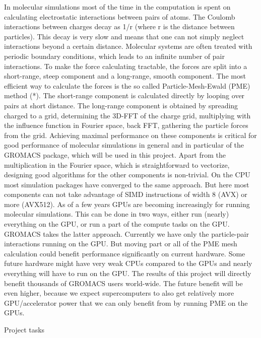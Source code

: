 \documentclass[12pt,a4paper]{report}
\begin{document}
\iffalse
In molecular simulations most of the time in the computation is spent on calculating electrostatic interactions between pairs of atoms. The Coulomb interactions between charges decay as 1/r (where r is the distance between particles). This decay is very slow and means that one can not simply neglect interactions beyond a certain distance. Molecular systems are often treated with periodic boundary conditions, which leads to an infinite number of pair interactions. To make the force calculating tractable, the forces are split into a short-range, steep component and a long-range, smooth component. The most efficient way to calculate the forces is the so called Particle-Mesh-Ewald (PME) method (*). The short-range component is calculated directly by looping over pairs at short distance. The long-range component is obtained by spreading charged to a grid, determining the 3D-FFT of the charge grid, multiplying with the influence function in Fourier space, back FFT, gathering the particle forces from the grid. Achieving maximal performance on these components is critical for good performance of molecular simulations in general and in particular of the GROMACS package, which will be used in this project. Apart from the multiplication in the Fourier space, which is straightforward to vectorize, designing good algorithms for the other components is non-trivial. On the CPU most simulation packages have converged to the same approach. But here most components can not take advantage of SIMD instructions of width 8 (AVX) or more (AVX512). As of a few years GPUs are becoming increasingly for running molecular simulations. This can be done in two ways, either run (nearly) everything on the GPU, or run a part of the compute tasks on the GPU. GROMACS takes the latter approach. Currently we have only the particle-pair interactions running on the GPU. But moving part or all of the PME mesh calculation could benefit performance significantly on current hardware. Some future hardware might have very weak CPUs compared to the GPUs and nearly everything will have to run on the GPU. The results of this project will directly benefit thousands of GROMACS users world-wide. The future benefit will be even higher, because we expect supercomputers to also get relatively more GPU/accelerator power that we can only benefit from by running PME on the GPUs.

Project tasks
\end{document}
